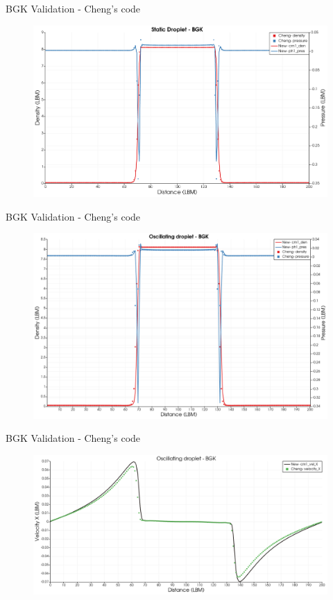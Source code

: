 \documentclass[8pt]{beamer}
\begin{document}
	\begin{frame}{BGK Validation - Cheng's code}
		\begin{figure}
			\centering
			\includegraphics[scale=0.3]{pics/BGK_StaticDroplet.png}
		\end{figure}
	\end{frame}
	\begin{frame}{BGK Validation - Cheng's code}
		\begin{figure}
			\centering
			\includegraphics[scale=0.3]{pics/BGK_OscDroplet_PRHO.png}
		\end{figure}
	\end{frame}
	\begin{frame}{BGK Validation - Cheng's code}
		\begin{figure}
			\centering
			\includegraphics[scale=0.3]{pics/BGK_OscDroplet_VelProf.png}
		\end{figure}
	\end{frame}
\end{document}
